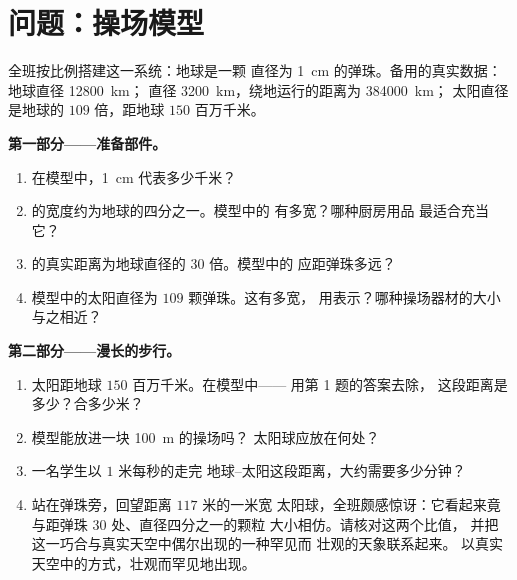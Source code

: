 \section{问题：操场模型}

\begin{problem}\label{pb:g6:sun-earth-moon:1}
全班按比例搭建这一系统：地球是一颗
直径为 \qty{1}{cm} 的弹珠。备用的真实数据：地球直径 \qty{12800}{km}；
直径 \qty{3200}{km}，绕地运行的距离为 \qty{384000}{km}；
太阳直径是地球的 $109$ 倍，距地球 $150$ 百万千米。

\medskip\noindent\textbf{第一部分——准备部件。}
\begin{enumerate}
  \item 在模型中，\qty{1}{cm} 代表多少千米？
  \item {}的宽度约为地球的四分之一。模型中的
        有多宽？哪种厨房用品
        最适合充当它？
  \item {}的真实距离为地球直径的 $30$ 倍。模型中的
        应距弹珠多远？
  \item 模型中的太阳直径为 $109$ 颗弹珠。这有多宽，
        用表示？哪种操场器材的大小
        与之相近？
\end{enumerate}

\medskip\noindent\textbf{第二部分——漫长的步行。}
\begin{enumerate}[resume]
  \item 太阳距地球 $150$ 百万千米。在模型中——
        用第 1 题的答案去除，
        这段距离是多少？合多少米？
  \item 模型能放进一块 \qty{100}{m} 的操场吗？
        太阳球应放在何处？
  \item 一名学生以 $1$ 米每秒的走完
        地球–太阳这段距离，大约需要多少分钟？
  \item 站在弹珠旁，回望距离 $117$ 米的一米宽
        太阳球，全班颇感惊讶：它看起来竟与距弹珠
        $30$ 处、直径四分之一的颗粒
        大小相仿。请核对这两个比值，
        并把这一巧合与真实天空中偶尔出现的一种罕见而
        壮观的天象联系起来。
        以真实天空中的方式，壮观而罕见地出现。
\end{enumerate}


\end{problem}

